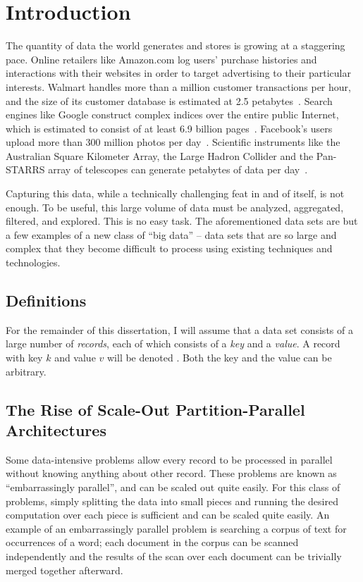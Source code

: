 \chapter{Introduction}

The quantity of data the world generates and stores is growing at a staggering
pace. Online retailers like Amazon.com log users' purchase histories and
interactions with their websites in order to target advertising to their
particular interests. Walmart handles more than a million customer transactions
per hour, and the size of its customer database is estimated at 2.5
petabytes~\cite{economist-data-data-everywhere}. Search engines like Google
construct complex indices over the entire public Internet, which is estimated
to consist of at least 6.9 billion pages~\cite{worldwidewebsize}. Facebook's
users upload more than 300 million photos per
day~\cite{jay-parikh-slideshow}. Scientific instruments like the Australian
Square Kilometer Array, the Large Hadron Collider and the Pan-STARRS array of
telescopes can generate petabytes of data per day~\cite{fourth-paradigm}.

Capturing this data, while a technically challenging feat in and of itself, is
not enough. To be useful, this large volume of data must be analyzed,
aggregated, filtered, and explored. This is no easy task. The aforementioned
data sets are but a few examples of a new class of ``big data'' -- data sets
that are so large and complex that they become difficult to process using
existing techniques and technologies.

\section{Definitions}

For the remainder of this dissertation, I will assume that a data set consists
of a large number of \emph{records}, each of which consists of a \emph{key} and
a \emph{value}. A record with key $k$ and value $v$ will be denoted
. Both the key and the value can be arbitrary.

\section{The Rise of Scale-Out Partition-Parallel Architectures}

Some data-intensive problems allow every record to be processed in parallel
without knowing anything about other record. These problems are known as
``embarrassingly parallel'', and can be scaled out quite easily. For this class
of problems, simply splitting the data into small pieces and running the
desired computation over each piece is sufficient and can be scaled quite
easily. An example of an embarrassingly parallel problem is searching a corpus
of text for occurrences of a word; each document in the corpus can be scanned
independently and the results of the scan over each document can be trivially
merged together afterward.

